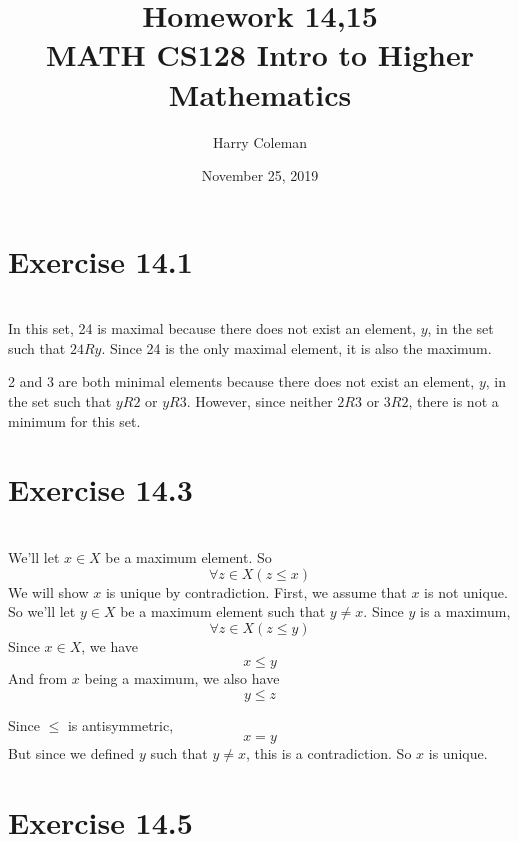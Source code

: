 \documentclass[11pt]{article}
\begin{document}
 
\title{Homework 14,15\\
    \large MATH CS128 Intro to Higher Mathematics}
\author{Harry Coleman}
\date{November 25, 2019}

\maketitle

\section*{Exercise 14.1}
\\

In this set, 24 is maximal because there does not exist an element, $y$, in the set such that $24Ry$. Since 24 is the only maximal element, it is also the maximum.

2 and 3 are both minimal elements because there does not exist an element, $y$, in the set such that $yR2$ or $yR3$. However, since neither $2R3$ or $3R2$, there is not a minimum for this set.


\section*{Exercise 14.3}
\\

We'll let $x\in X$ be a maximum element. So
\[\forall z\in X(z\leq x)\]
We will show $x$ is unique by contradiction. First, we assume that $x$ is not unique. So we'll let $y\in X$ be a maximum element such that $y\ne x$. Since $y$ is a maximum,
\[\forall z\in X(z \leq y)\]
Since $x\in X$, we have
\[x\leq y\]
And from $x$ being a maximum, we also have
\[y\leq z\]

Since $\leq$ is antisymmetric,
\[x=y\]
But since we defined $y$ such that $y\ne x$, this is a contradiction. So $x$ is unique.


\newpage
\section*{Exercise 14.5}
\\
\end{document}
